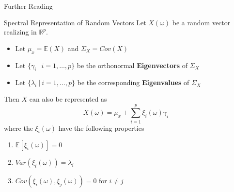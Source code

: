 \documentclass{beamer}
\begin{document}
	\begin{frame}{Further Reading}
		\nocite{hsing_theoretical_2015}
		\nocite{kokoszka_introduction_2017}
		\nocite{Bohacs_Ovadi_Salgo1998}
		\nocite{FR_li_et_al_2020} 
		\nocite{Reiss_2007b}
		\nocite{ramsay_functional_2005}
		\AtNextBibliography{\tiny}
		\printbibliography[heading=none]
	\end{frame}
	
	
	\begin{frame}{Spectral Representation of Random Vectors}\label{spectral}
		Let $X(\omega)$ be a random vector realizing in $\mathbb{R}^p$.
		
		\begin{itemize}
			\item Let $\mu_x = \mathbb{E}(X)$ and $\Sigma_X = Cov(X)$
			\item Let $\{\gamma_i \: \vert \: i = 1, \dots, p\}$ be the orthonormal \textbf{Eigenvectors} of $\Sigma_X$
			\item Let $\{\lambda_i \: \vert \: i = 1, \dots, p\}$ be the corresponding \textbf{Eigenvalues} of $\Sigma_X$
		\end{itemize}
		
		\vspace{0.2cm}
		Then $X$ can also be represented as
		$$X(\omega) = \mu_x + \sum_{i = 1}^{p} \xi_i(\omega) \gamma_i$$
		where the $\xi_i(\omega)$ have the following properties
		
		\begin{multicols}{2}
			\begin{enumerate}
				\item $\mathbb{E}[\xi_i(\omega)] = 0$
				\item $Var(\xi_i(\omega)) = \lambda_i$
				\item $Cov(\xi_i(\omega), \xi_j(\omega)) = 0$ for $i \neq j$
			\end{enumerate}
		\end{multicols}
	
		\hyperlink{KLE}{}
	\end{frame}
\end{document}
